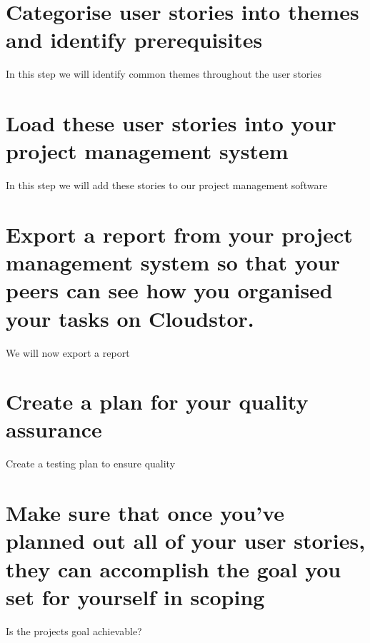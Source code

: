 \documentclass{article}
\begin{document}
\section{Categorise user stories into themes and identify prerequisites}
In this step we will identify common themes throughout the user stories
\section{Load these user stories into your project management system}
In this step we will add these stories to our project management software
\section{Export a report from your project management system so that your peers can see how you organised your tasks on Cloudstor.}
We will now export a report
\section{Create a plan for your quality assurance}
Create a testing plan to ensure quality
\section{Make sure that once you’ve planned out all of your user stories, they can accomplish the goal you set for yourself in scoping}
Is the projects goal achievable?
\end{document}
